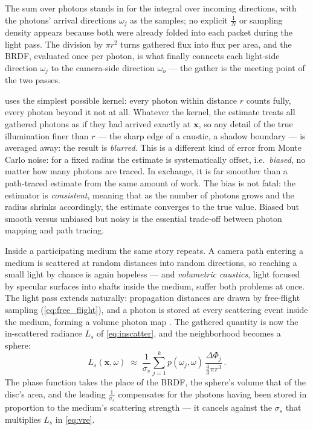 The sum over photons stands in for the integral over incoming directions, with the photons' arrival directions $\omega_j$ as the samples; no explicit $\frac{1}{N}$ or sampling density appears because both were already folded into each packet during the light pass. The division by $\pi r^2$ turns gathered flux into flux per area, and the BRDF, evaluated once per photon, is what finally connects each light-side direction $\omega_j$ to the camera-side direction $\omega_o$ --- the gather is the meeting point of the two passes.

 uses the simplest possible kernel: every photon within distance $r$ counts fully, every photon beyond it not at all. Whatever the kernel, the estimate treats all gathered photons as if they had arrived exactly at $\mathbf{x}$, so any detail of the true illumination finer than $r$ --- the sharp edge of a caustic, a shadow boundary --- is averaged away: the result is \emph{blurred}. This is a different kind of error from Monte Carlo noise: for a fixed radius the estimate is systematically offset, i.e.\ \emph{biased}, no matter how many photons are traced. In exchange, it is far smoother than a path-traced estimate from the same amount of work. The bias is not fatal: the estimator is \emph{consistent}, meaning that as the number of photons grows and the radius shrinks accordingly, the estimate converges to the true value. Biased but smooth versus unbiased but noisy is the essential trade-off between photon mapping and path tracing.

Inside a participating medium the same story repeats. A camera path entering a medium is scattered at random distances into random directions, so reaching a small light by chance is again hopeless --- and \emph{volumetric caustics}, light focused by specular surfaces into shafts inside the medium, suffer both problems at once. The light pass extends naturally: propagation distances are drawn by free-flight sampling (\cref{eq:free_flight}), and a photon is stored at every scattering event inside the medium, forming a volume photon map \cite{jensen98}. The gathered quantity is now the in-scattered radiance $L_s$ of \cref{eq:inscatter}, and the neighborhood becomes a sphere:
\begin{equation}
	\label{eq:volume_gather}
	L_s(\mathbf{x}, \omega) \;\approx\; \frac{1}{\sigma_s} \sum_{j=1}^{k} p(\omega_j, \omega) \, \frac{\Delta\Phi_j}{\tfrac{4}{3}\pi r^3} \,.
\end{equation}
The phase function takes the place of the BRDF, the sphere's volume that of the disc's area, and the leading $\frac{1}{\sigma_s}$ compensates for the photons having been stored in proportion to the medium's scattering strength --- it cancels against the $\sigma_s$ that multiplies $L_s$ in \cref{eq:vre}.

